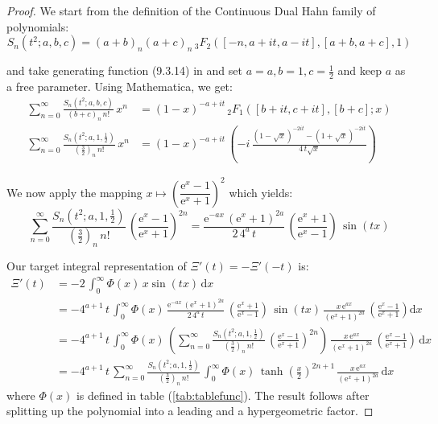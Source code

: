 \documentclass[a4paper,11pt,twoside]{amsart}
\begin{document}
\begin{proof}
We start from the definition of the Continuous Dual Hahn family of polynomials:
\begin{equation}
 S_n(t^2;a,b,c) = (a+b)_n(a+c)_n\, {}_3F_2([-n,a+it, a- it], [a+b, a+c], 1) 
\end{equation}

and take generating function (9.3.14) in \cite{koe} and set $a=a,b=1,c=\frac12$ and keep $a$ as a free parameter. Using Mathematica, we get:
\begin{align}
 \sum_{n=0}^\infty \frac{S_n(t^2;a,b,c)}{(b+c)_n\,n!}\, x^n &= (1-x)^{-a+it}\,{}_2F_1\left([b+it, c+it],[b+c] ;x\right) \\
\sum_{n=0}^\infty \frac{S_n\left(t^2;a,1,\frac12\right)}{\left(\frac32\right)_n\,n!}\,x^n&= (1-x)^{-a+it}\,\left(-i\,\frac{(1-\sqrt{x})^{-2it}-(1+\sqrt{x})^{-2it}}{4\,t\sqrt{x}}\right)
\end{align}

We now apply the mapping $x \mapsto \left(\dfrac{\textrm{e}^{x}-1}{\textrm{e}^{x}+1}\right)^2$ which yields:
\begin{equation}
 \sum_{n=0}^\infty \frac{S_n\left(t^2;a,1,\frac12\right)}{\left(\frac32\right)_n\,n!}\, \left(\frac{\textrm{e}^{x}-1}{\textrm{e}^{x}+1}\right)^{2n} = \frac{\mathrm{e}^{-ax}\,(\mathrm{e}^x+1)^{2a}}{2\,4^a\,t}\,\left(\frac{\textrm{e}^{x}+1}{\textrm{e}^{x}-1}\right)\,\sin(tx)
\end{equation}

Our target integral representation of $\Xi'(t) = -\Xi'(-t)$ is:
\begin{align}
 \Xi'(t) &= -2\,\int_{0}^\infty \Phi(x)\,x\sin(tx)\, \mathrm{d}x \\
 &=-4^{a+1}\,t\, \int_{0}^\infty \Phi(x)\,\frac{\mathrm{e}^{-ax}\,(\mathrm{e}^x+1)^{2a}}{2\,4^a\,t}\,\left(\frac{\textrm{e}^{x}+1}{\textrm{e}^{x}-1}\right)\,\sin(tx)\, \frac{x\,\mathrm{e}^{ax}}{(\mathrm{e}^x+1)^{2a}}\,\left(\frac{\textrm{e}^{x}-1}{\textrm{e}^{x}+1}\right) \mathrm{d}x \\
 &=-4^{a+1}\,t\, \int_{0}^\infty \Phi(x)\,\left(\sum_{n=0}^\infty \frac{S_n\left(t^2;a,1,\frac12\right)}{\left(\frac32\right)_n\,n!}\, \left(\frac{\textrm{e}^{x}-1}{\textrm{e}^{x}+1}\right)^{2n}\right)\, \frac{x\,\mathrm{e}^{ax}}{(\mathrm{e}^x+1)^{2a}}\,\left(\frac{\textrm{e}^{x}-1}{\textrm{e}^{x}+1}\right)\, \mathrm{d}x \\
 &=-4^{a+1}\,t\,\sum_{n=0}^\infty \frac{S_n\left(t^2;a,1,\frac12\right)}{\left(\frac32\right)_n\,n!}\, \int_{0}^\infty \Phi(x)\,\tanh\left(\frac{x}{2}\right)^{2n+1}\, \frac{x\,\mathrm{e}^{ax}}{(\mathrm{e}^x+1)^{2a}}\, \mathrm{d}x
\end{align}
where $\Phi(x)$ is defined in table (\ref{tab:tablefunc}). The result follows after splitting up the polynomial into a leading and a hypergeometric factor.
\end{proof}
\end{document}
